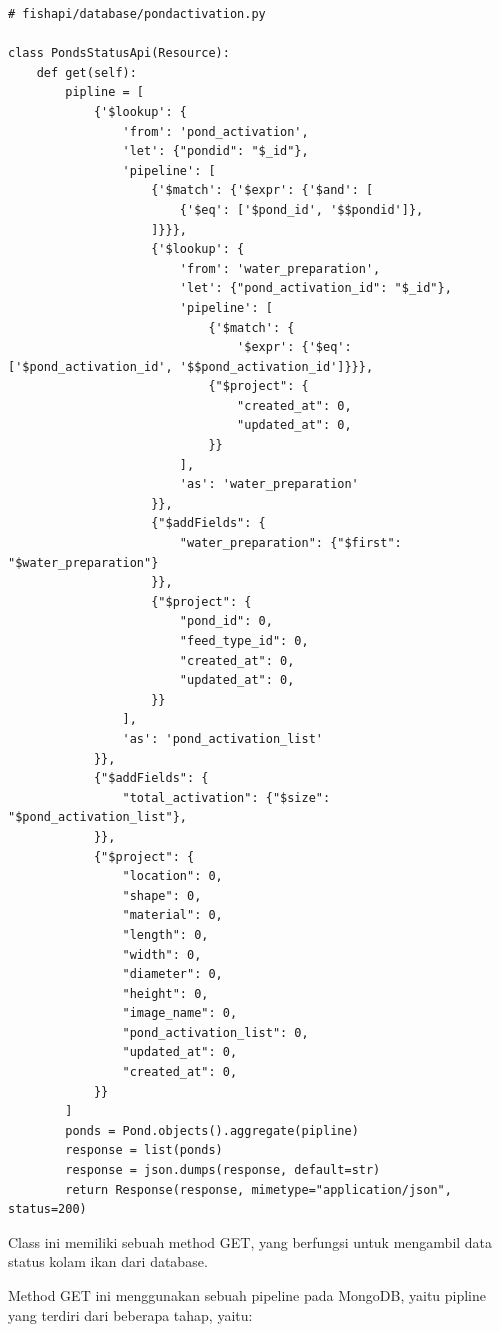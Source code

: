 \begin{enumerate}[1.]
\begin{lstlisting}
# fishapi/database/pondactivation.py

class PondsStatusApi(Resource):
    def get(self):
        pipline = [
            {'$lookup': {
                'from': 'pond_activation',
                'let': {"pondid": "$_id"},
                'pipeline': [
                    {'$match': {'$expr': {'$and': [
                        {'$eq': ['$pond_id', '$$pondid']},
                    ]}}},
                    {'$lookup': {
                        'from': 'water_preparation',
                        'let': {"pond_activation_id": "$_id"},
                        'pipeline': [
                            {'$match': {
                                '$expr': {'$eq': ['$pond_activation_id', '$$pond_activation_id']}}},
                            {"$project": {
                                "created_at": 0,
                                "updated_at": 0,
                            }}
                        ],
                        'as': 'water_preparation'
                    }},
                    {"$addFields": {
                        "water_preparation": {"$first": "$water_preparation"}
                    }},
                    {"$project": {
                        "pond_id": 0,
                        "feed_type_id": 0,
                        "created_at": 0,
                        "updated_at": 0,
                    }}
                ],
                'as': 'pond_activation_list'
            }},
            {"$addFields": {
                "total_activation": {"$size": "$pond_activation_list"},
            }},
            {"$project": {
                "location": 0,
                "shape": 0,
                "material": 0,
                "length": 0,
                "width": 0,
                "diameter": 0,
                "height": 0,
                "image_name": 0,
                "pond_activation_list": 0,
                "updated_at": 0,
                "created_at": 0,
            }}
        ]
        ponds = Pond.objects().aggregate(pipline)
        response = list(ponds)
        response = json.dumps(response, default=str)
        return Response(response, mimetype="application/json", status=200)
\end{lstlisting}

Class ini memiliki sebuah method GET, yang berfungsi untuk mengambil data status kolam ikan dari database.

Method GET ini menggunakan sebuah pipeline pada MongoDB, yaitu pipline yang terdiri dari beberapa tahap, yaitu:


\end{enumerate}
